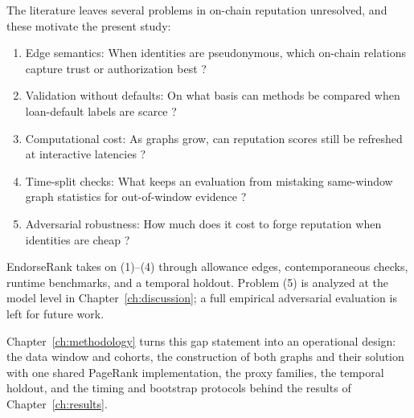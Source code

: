 
The literature leaves several problems in on-chain reputation unresolved, and these motivate the present study:

\begin{enumerate}
\item Edge semantics: When identities are pseudonymous, which on-chain relations capture trust or authorization best ?
\item Validation without defaults: On what basis can methods be compared when loan-default labels are scarce ?
\item Computational cost: As graphs grow, can reputation scores still be refreshed at interactive latencies ?
\item Time-split checks: What keeps an evaluation from mistaking same-window graph statistics for out-of-window evidence ?
\item Adversarial robustness: How much does it cost to forge reputation when identities are cheap ?
\end{enumerate}

EndorseRank takes on (1)--(4) through allowance edges, contemporaneous checks, runtime benchmarks, and a temporal holdout. Problem (5) is analyzed at the model level in Chapter~\ref{ch:discussion}; a full empirical adversarial evaluation is left for future work.

Chapter~\ref{ch:methodology} turns this gap statement into an operational design: the data window and cohorts, the construction of both graphs and their solution with one shared PageRank implementation, the proxy families, the temporal holdout, and the timing and bootstrap protocols behind the results of Chapter~\ref{ch:results}.


